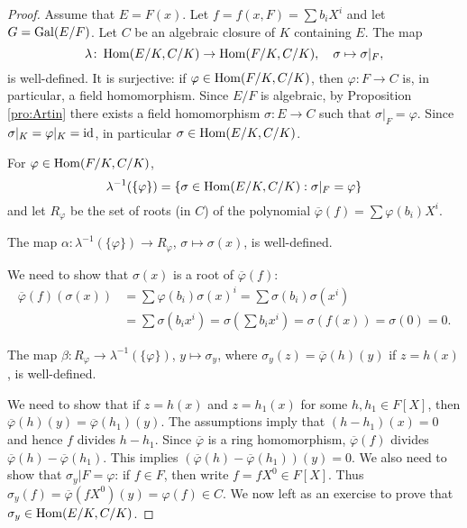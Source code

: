  \begin{proof}
    Assume that $E=F(x)$. Let $f=f(x,F)=\sum b_iX^i$ and
    let $G=\operatorname{Gal}(E/F)$. Let $C$ be an algebraic closure of $K$ containing $E$. 
    The map
    \[
    \lambda\colon \operatorname{Hom}(E/K,C/K)\to\operatorname{Hom}(F/K,C/K),\quad
    \sigma\mapsto\sigma|_F,
    \]
    is well-defined. It is surjective: if $\varphi\in\operatorname{Hom}(F/K,C/K)$, then $\varphi\colon F\to C$ is, 
    in particular, a field homomorphism. Since $E/F$ is algebraic, by Proposition \ref{pro:Artin} 
    there exists a field homomorphism 
    $\sigma\colon E\to C$ such that $\sigma|_F=\varphi$. Since $\sigma|_K=\varphi|_K=\operatorname{id}$, in particular 
    $\sigma\in\operatorname{Hom}(E/K,C/K)$. 
    
    For $\varphi\in\operatorname{Hom}(F/K,C/K)$,  
    \[
    \lambda^{-1}(\{\varphi\})=\{\sigma\in\operatorname{Hom}(E/K,C/K):\sigma|_F=\varphi\}
    \]
    and let $R_\varphi$ be the set of roots (in $C$) of the polynomial $\overline{\varphi}(f)=\sum\varphi(b_i)X^i$. 
    
    \begin{claim}
    The map $\alpha\colon \lambda^{-1}(\{\varphi\})\to R_{\varphi}$, $\sigma\mapsto\sigma(x)$, is well-defined. 
    \end{claim}
    
    We need to show that $\sigma(x)$ is a root of $\overline{\varphi}(f)$:
    \begin{align*}
    \overline{\varphi}(f)(\sigma(x))&=\sum \varphi(b_i)\sigma(x)^i
    =\sum\sigma(b_i)\sigma(x^i)\\
    &=\sum\sigma(b_ix^i)=\sigma\left(\sum b_ix^i\right)=\sigma(f(x))=\sigma(0)=0.
    \end{align*}
    
    \begin{claim}
    The map $\beta\colon R_{\varphi}\to \lambda^{-1}(\{\varphi\})$, $y\mapsto\sigma_y$, 
    where $\sigma_y(z)=\overline{\varphi}(h)(y)$
    if $z=h(x)$, is well-defined. 
    \end{claim}
    
    We need to show that if $z=h(x)$ and 
    $z=h_1(x)$ for some $h,h_1\in F[X]$, then 
    $\overline{\varphi}(h)(y)=\overline{\varphi}(h_1)(y)$. 
    The assumptions imply that 
    $(h-h_1)(x)=0$ and hence $f$ divides $h-h_1$. Since
    $\overline{\varphi}$ is a ring homomorphism, 
    $\overline{\varphi}(f)$ divides $\overline{\varphi}(h)-\overline{\varphi}(h_1)$. 
    This implies $(\overline{\varphi}(h)-\overline{\varphi}(h_1))(y)=0$. We also need to show that 
    $\sigma_y|F=\varphi$: if $f\in F$, then 
    write $f=fX^0\in F[X]$. Thus 
    $\sigma_y(f)=\overline{\varphi}(fX^0)(y)=\varphi(f)\in C$. 
    We now left as an exercise to prove that $\sigma_y\in\operatorname{Hom}(E/K,C/K)$. 
    

\end{proof}
